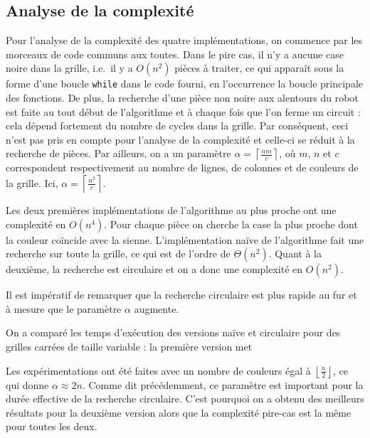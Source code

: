 \documentclass[12pt,a4paper]{article}
\begin{document}
\subsection*{Analyse de la complexit\'e}
Pour l'analyse de la complexit\'e des quatre impl\'ementations, on 
commence par les morceaux de code communs aux toutes. Dans le pire cas, 
il n'y a aucune case noire dans la grille, i.e.\ il y a $O(n^2)$ pi\`eces \`a 
traiter, ce qui appara\^it sous la forme d'une boucle \texttt{while} dans le 
code fourni, en l'occurrence la boucle principale des fonctions. De 
plus, la recherche d'une pi\`ece non noire aux alentours du robot est faite au 
tout d\'ebut de l'algorithme et \`a chaque fois que l'on ferme un 
circuit : cela d\'epend fortement du nombre de cycles dans la grille. Par 
cons\'equent, ceci n'est pas pris en compte pour l'analyse de la complexit\'e et 
celle-ci se r\'eduit \`a la recherche de pi\`eces. Par ailleurs, on a un 
param\`etre $\alpha = \left \lceil \frac{nm}{c} 
\right \rceil$, o\`u $m$, $n$ et $c$ correspondent respectivement au nombre 
de lignes, de colonnes et de couleurs de la grille. Ici, $\alpha = \left \lceil 
\frac{n^2}{c} \right \rceil$.\par
Les deux premi\`eres impl\'ementations de l'algorithme au plus proche ont une 
complexit\'e en $O(n^4)$. Pour chaque pi\`ece on cherche la case la plus proche 
dont la couleur co\"incide avec la sienne. L'impl\'ementation na\"ive de 
l'algorithme fait une recherche sur toute la grille, ce qui est de l'ordre de 
$\Theta(n^2)$. Quant \`a la deuxi\`eme, la recherche est circulaire et on a donc 
une complexit\'e en $O(n^2)$.

Il est imp\'eratif de remarquer que la recherche circulaire est 
plus rapide au fur et \`a mesure que le param\`etre $\alpha$ augmente. \par
On a compar\'e les temps d'ex\'ecution des versions na\"ive et circulaire pour 
des grilles carr\'ees de taille variable : la premi\`ere version met 

Les exp\'erimentations ont \'et\'e faites avec un nombre de couleurs \'egal \`a 
$\left \lfloor \frac{n}{2} \right \rfloor$, ce qui donne $\alpha \approx 2n$. 
Comme dit pr\'ec\'edemment, ce param\`etre est important pour la dur\'ee 
effective de la recherche circulaire. C'est pourquoi on a obtenu des meilleurs 
r\'esultats pour la deuxi\`eme version alors que la complexit\'e pire-cas est 
la m\^eme pour toutes les deux.
\end{document}
